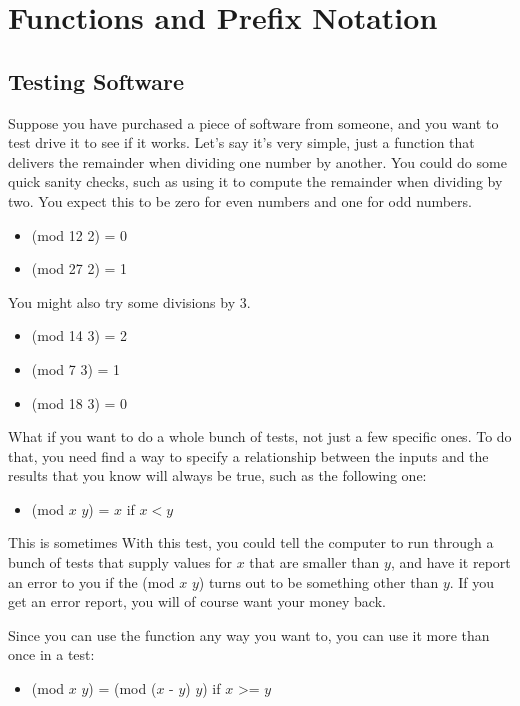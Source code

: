 ﻿\chapter{Functions and Prefix Notation}

\section{Testing Software}

Suppose you have purchased a piece of software from someone, and you want to test drive it to see if it works. Let's say it's very simple, just a function that delivers the remainder when dividing one number by another. You could do some quick sanity checks, such as using it to compute the remainder when dividing by two. You expect this to be zero for even numbers and one for odd numbers.

\begin{itemize}
 \item (mod 12 2) = 0
 \item (mod 27 2) = 1
\end{itemize}

You might also try some divisions by 3.

\begin{itemize}
 \item (mod 14 3) = 2
 \item (mod 7  3) = 1
 \item (mod 18 3) = 0
\end{itemize}

What if you want to do a whole bunch of tests, not just a few specific ones. To do that, you need find a way to specify a relationship between the inputs and the results that you know will always be true, such as the following one:

\begin{itemize}
 \item (mod $x$ $y$) = $x$ if $x < y$
\end{itemize}

This is sometimes
With this test, you could tell the computer to run through a bunch of tests that supply values for $x$ that are smaller than $y$, and have it report an error to you if the (mod $x$ $y$) turns out to be something other than $y$. If you get an error report, you will of course want your money back.

Since you can use the function any way you want to, you can use it more than once in a test:

\begin{itemize}
\item (mod $x$ $y$) = (mod ($x$ - $y$) $y$) if $x$ >= $y$
\end{itemize}

